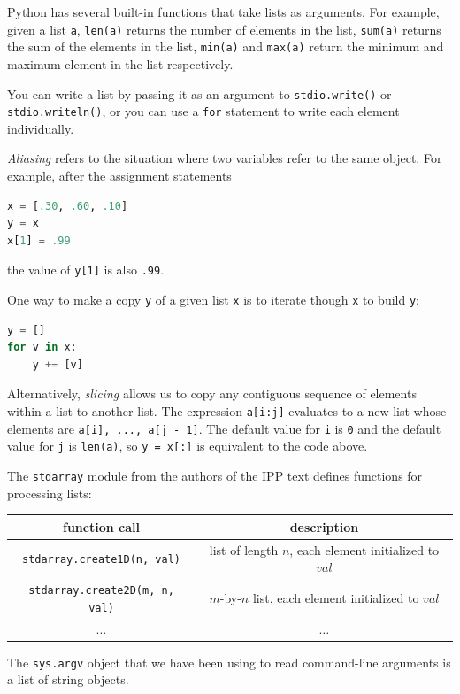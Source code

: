 \documentclass[8pt,a4paper,compress,handout]{beamer}
\begin{document}
\begin{frame}[fragile]
Python has several built-in functions that take lists as arguments. For example, given a list \lstinline{a}, \lstinline{len(a)} returns the number of elements in the list, \lstinline{sum(a)} returns the sum of the elements in the list, \lstinline{min(a)} and \lstinline{max(a)} return the minimum and maximum element in the list respectively.

\bigskip

You can write a list by passing it as an argument to \lstinline{stdio.write()} or \lstinline{stdio.writeln()}, or you can use a \lstinline{for} statement to write each element individually.

\bigskip

\emph{Aliasing} refers to the situation where two variables refer to the same object. For example, after the assignment statements
\begin{lstlisting}[language=Python]
x = [.30, .60, .10]
y = x
x[1] = .99
\end{lstlisting}
the value of \lstinline{y[1]} is also \lstinline{.99}.
\end{frame}

\begin{frame}[fragile]
One way to make a copy \lstinline{y} of a given list \lstinline{x} is to iterate though \lstinline{x} to build \lstinline{y}:
\begin{lstlisting}[language=Python]
y = []
for v in x:
    y += [v]
\end{lstlisting}

\bigskip

Alternatively, \emph{slicing} allows us to copy any contiguous sequence of elements within a list to another list. The expression \lstinline{a[i:j]} evaluates to a new list whose elements are \lstinline{a[i], ..., a[j - 1]}. The default value for \lstinline{i} is \lstinline{0} and the default value for \lstinline{j} is \lstinline{len(a)}, so \lstinline{y = x[:]} is equivalent to the code above.

\bigskip

The \lstinline{stdarray} module from the authors of the IPP text defines functions for processing lists:

\begin{center}
\begin{tabular}{cc}
function call & description \\ \hline
\lstinline$stdarray.create1D(n, val)$ & list of length $n$, each element initialized to $val$ \\
\lstinline$stdarray.create2D(m, n, val)$ & $m$-by-$n$ list, each element initialized to $val$ \\
$\dots$ & $\dots$
\end{tabular} 
\end{center}

\bigskip

The \lstinline{sys.argv} object that we have been using to read command-line arguments is a list of string objects.
\end{frame}
\end{document}
